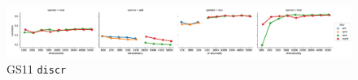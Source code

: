 \begin{figure}[b]
  \centering

  \includegraphics[width=1.1\textwidth]{supplement/figures/GS11-interaction-discr}

  \caption{GS11 \texttt{discr}}
  \label{fig:gs11-discr}
\end{figure}
